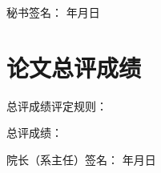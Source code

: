 \documentclass[12pt,a4paper]{ctexart}
\begin{document}
\noindent 秘书签名：\underline{\hspace{3cm}} \hspace{2cm} \underline{\hspace{1cm}}年\underline{\hspace{1cm}}月\underline{\hspace{1cm}}日

\newpage

\section*{论文总评成绩}

总评成绩评定规则：

\vspace{1cm}

总评成绩：\underline{\hspace{4cm}}

\vspace{1cm}
\noindent 院长（系主任）签名：\underline{\hspace{3cm}} \hspace{2cm} \underline{\hspace{1cm}}年\underline{\hspace{1cm}}月\underline{\hspace{1cm}}日
\end{document}
